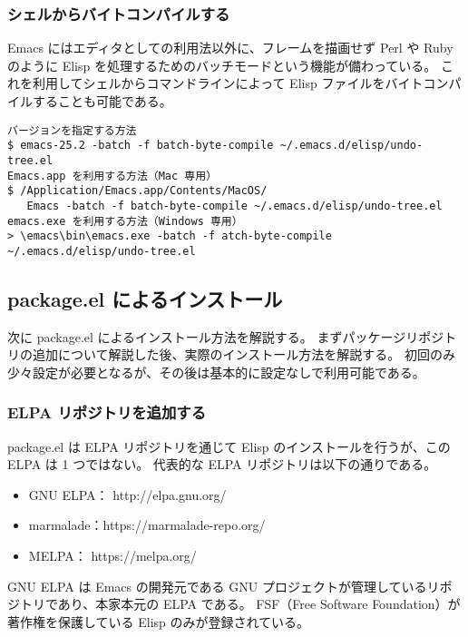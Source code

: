 \subsubsection{シェルからバイトコンパイルする}
Emacs にはエディタとしての利用法以外に、フレームを描画せず Perl や Ruby のように Elisp を処理するためのバッチモードという機能が備わっている。
これを利用してシェルからコマンドラインによって Elisp ファイルをバイトコンパイルすることも可能である。
\begin{mdframed}[roundcorner=0.50zw,leftmargin=3.00zw,rightmargin=3.00zw,skipabove=0.40zw,skipbelow=0.40zw,innertopmargin=4.00pt,innerbottommargin=4.00pt,innerleftmargin=5.00pt,innerrightmargin=5.00pt,linecolor=gray!090,linewidth=0.50pt,backgroundcolor=gray!90]\color{gray!10}
\begin{verbatim}
バージョンを指定する方法
$ emacs-25.2 -batch -f batch-byte-compile ~/.emacs.d/elisp/undo-tree.el
Emacs.app を利用する方法（Mac 専用）
$ /Application/Emacs.app/Contents/MacOS/
   Emacs -batch -f batch-byte-compile ~/.emacs.d/elisp/undo-tree.el
emacs.exe を利用する方法（Windows 専用）
> \emacs\bin\emacs.exe -batch -f atch-byte-compile ~/.emacs.d/elisp/undo-tree.el
\end{verbatim}
\end{mdframed}
\subsection{package.el によるインストール}
次に package.el によるインストール方法を解説する。
まずパッケージリポジトリの追加について解説した後、実際のインストール方法を解説する。
初回のみ少々設定が必要となるが、その後は基本的に設定なしで利用可能である。
\subsubsection{ELPA リポジトリを追加する}
package.el は ELPA リポジトリを通じて Elisp のインストールを行うが、この ELPA は 1 つではない。
代表的な ELPA リポジトリは以下の通りである。
\begin{itemize}\setlength{\leftskip}{-0.40zw}%
\item GNU ELPA： \hspc{0.00pt}http://elpa.gnu.org/
\item marmalade：\hspc{6.00pt}https://marmalade-repo.org/
\item MELPA：    \hspc{15.0pt}https://melpa.org/
\end{itemize}
GNU ELPA は Emacs の開発元である GNU プロジェクトが管理しているリポジトリであり、本家本元の ELPA である。
FSF（Free Software Foundation）が著作権を保護している Elisp のみが登録されている。\\

